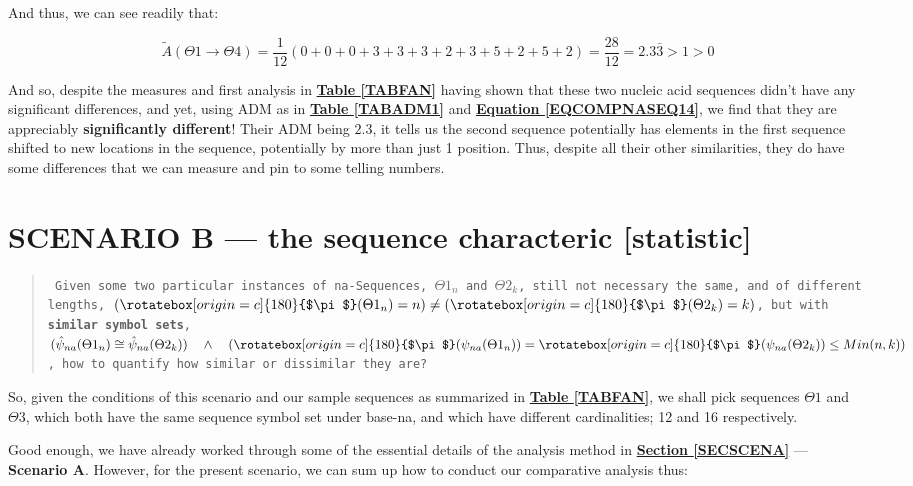 \documentclass[a4paper, 18pt]{book} %
\newcommand{\invpi}{\rotatebox[origin=c]{180}{$\pi$}}
\begin{document}
And thus, we can see readily that:

\vspace{1em}
\begin{equation}
\label{EQCOMPNASEQ14}
\tilde{A}(\Theta1 \rightarrow \Theta4) = \frac{1}{12}(0 + 0 + 0 + 3 + 3 + 3 + 2 + 3 + 5 + 2 + 5 + 2) = \frac{28}{12} = 2.3\bar{3} > 1 > 0
\end{equation}
\vspace{1em}

And so, despite the measures and first analysis in \textbf{\hyperref[TABFAN]{Table \ref{TABFAN}}} having shown that these two nucleic acid sequences didn't have any significant differences, and yet, using ADM as in \textbf{\hyperref[TABADM1]{Table \ref{TABADM1}}} and \textbf{\hyperref[EQCOMPNASEQ14]{Equation \ref{EQCOMPNASEQ14}}}, we find that they are appreciably \textbf{significantly different}! Their ADM being $2.3$, it tells us the second sequence potentially has elements in the first sequence shifted to new locations in the sequence, potentially by more than just 1 position. Thus, despite all their other similarities, they do have some differences that we can measure and pin to some telling numbers.

\section{SCENARIO B --- the sequence characteric [statistic]}
\label{SECSCENB}

\begin{quote}
\small
\texttt{
Given some two particular instances of na-Sequences, $\Theta1_n$ and $\Theta2_k$, still not necessary the same, and of different lengths, $(\invpi(\Theta1_n) = n) \neq (\invpi(\Theta2_k) = k)$, but with \textbf{similar symbol sets}, $(\hat{\psi}_{na}(\Theta1_n) \cong \hat{\psi}_{na}(\Theta2_k)) \quad \land \quad (\invpi(\psi_{na}(\Theta1_n)) = \invpi(\psi_{na}(\Theta2_k)) \leq Min(n,k))$, how to quantify how similar or dissimilar they are?}
\end{quote}

So, given the conditions of this scenario and our sample sequences as summarized in \textbf{\hyperref[TABFAN]{Table \ref{TABFAN}}}, we shall pick sequences $\Theta1$ and $\Theta3$, which both have the same sequence symbol set under base-na, and which have different cardinalities; 12 and 16 respectively.

Good enough, we have already worked through some of the essential details of the analysis method in \textbf{\hyperref[SECSCENA]{Section \ref{SECSCENA}}} --- \textbf{Scenario A}. However, for the present scenario, we can sum up how to conduct our comparative analysis thus:
\end{document}
